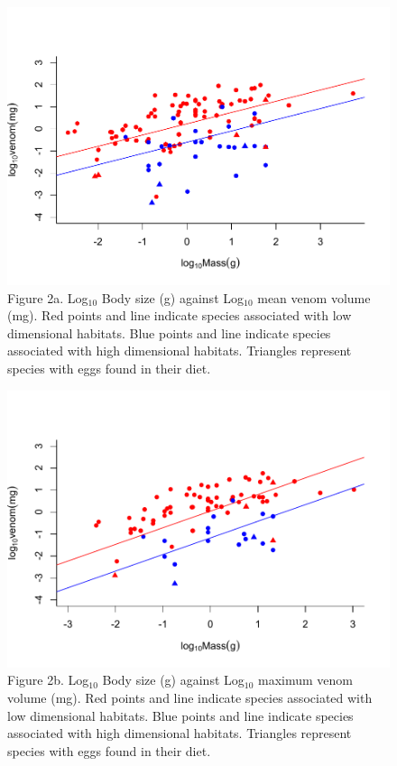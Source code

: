 \begin{figure}[h!]
  \centering
  \includegraphics[width=.95\textwidth]{ch4-snakes/figure2aver.pdf}%
  \caption*{Figure 2a. Log$_{10}$ Body size (g) against Log$_{10}$ mean venom volume (mg). Red points and line indicate species associated with low dimensional habitats. Blue points and line indicate species associated with high dimensional habitats. Triangles represent species with eggs found in their diet.}
  \label{fig:Figure 1.}
\end{figure}




\begin{figure}[h!]
  \centering
  \includegraphics[width=.95\textwidth]{ch4-snakes/figure2max.pdf}%
  \caption*{Figure 2b. Log$_{10}$ Body size (g) against Log$_{10}$ maximum venom volume (mg). Red points and line indicate species associated with low dimensional habitats. Blue points and line indicate species associated with high dimensional habitats. Triangles represent species with eggs found in their diet.}
  \label{fig:Figure 2b.}
\end{figure}


